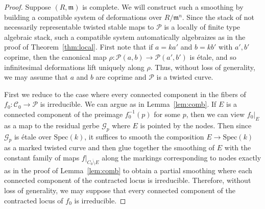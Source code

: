 \documentclass[11pt]{amsart}
\numberwithin{equation}{section}
\theoremstyle{definition}
\theoremstyle{remark}
\newcommand{\calG}{\mathcal G}
\newcommand{\calC}{\mathcal C}
\newcommand{\calP}{\mathcal P}
\newcommand{\Spec}{\mathrm{Spec}}
\begin{document}
\begin{proof} Suppose $(R,\mathfrak{m})$ is complete. We will construct such a smoothing by building a compatible system of deformations over $R/\mathfrak{m}^n$. Since the stack of not necessarily representable twisted stable maps to $\calP$ is a locally of finite type algebraic stack, such a compatible system automatically algebraizes as in the proof of Theorem~\ref{thm:local}. First note that if $a = ka'$ and $b = kb'$ with $a', b'$ coprime, then the canonical map $\rho \colon  \calP(a,b) \to \calP(a',b')$ is \'etale, and so infinitesimal deformations lift uniquely along $\rho$. Thus, without loss of generality, we may assume that $a$ and $b$ are coprime and $\calP$ is a twisted curve. 

  First we reduce to the case where every connected component in the fibers of $f_0 \colon  \calC_0 \to \calP$ is irreducible. We can argue as in Lemma~\ref{lem:comb}. If $E$ is a connected component of the preimage $f_0^{-1}(p)$ for some $p$, then we can view $f_0|_E$ as a map to the residual gerbe $\calG_p$ where $E$ is pointed by the nodes. Then since $\calG_p$ is \'etale over $\Spec(k)$, it suffices to smooth the composition $E \to \Spec(k)$ as a marked twisted curve and then glue together the smoothing of $E$ with the  constant family of maps $f|_{\overline{C_0 \setminus E}}$ along the markings corresponding to nodes exactly as in the proof of Lemma~\ref{lem:comb} to obtain a partial smoothing where each connected component of the contracted locus is irreducible. Therefore, without loss of generality, we may suppose that every connected component of the contracted locus of $f_0$ is irreducible.



\end{proof}
\end{document}

